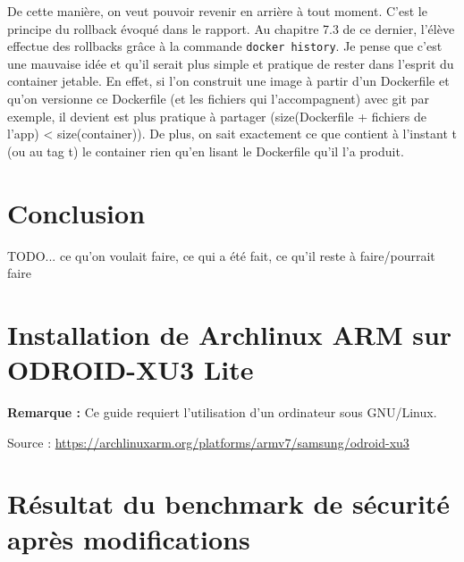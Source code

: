 \documentclass[11pt,a4paper,oneside]{report}
\newcommand{\code}[1]{\texttt{#1}}
\newcommand{\odroid}{ODROID-XU3 Lite }
\begin{document}
De cette manière, on veut pouvoir revenir en arrière à tout moment. C'est le principe du rollback évoqué dans le rapport. Au chapitre 7.3 de ce dernier, l'élève effectue des rollbacks grâce à la commande \code{docker history}. Je pense que c'est une mauvaise idée et qu'il serait plus simple et pratique de rester dans l'esprit du container jetable. En effet, si l'on construit une image à partir d'un Dockerfile et qu'on versionne ce Dockerfile (et les fichiers qui l'accompagnent) avec git par exemple, il devient est plus pratique à partager (size(Dockerfile + fichiers de l'app) \textless{} size(container)). De plus, on sait exactement ce que contient à l'instant t (ou au tag t) le container rien qu'en lisant le Dockerfile qu'il l'a produit.

\chapter{Conclusion}
TODO... ce qu'on voulait faire, ce qui a été fait, ce qu'il reste à faire/pourrait faire


\nocite{*} %



\begin{appendices}

\chapter{Installation de Archlinux ARM sur \odroid}\label{install_alarm_odroid}
\textbf{Remarque : }Ce guide requiert l'utilisation d'un ordinateur sous GNU/Linux.

Source : \url{https://archlinuxarm.org/platforms/armv7/samsung/odroid-xu3}




\chapter{Résultat du benchmark de sécurité après modifications}\label{apx-bench-after-modif}

\inputminted[xleftmargin=20pt, linenos=true, breaklines=true, frame=single, framesep=6pt, tabsize=2, fontfamily=courier, fontsize=\small]{text}{../../docker_security_benchmark/after-modifications.log}

\end{appendices}
\end{document}
